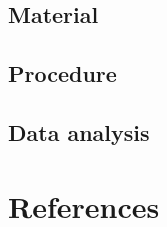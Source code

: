 \documentclass[
  man,floatsintext]{apa6}
\begin{document}
\hypertarget{material}{%
\subsection{Material}\label{material}}

\hypertarget{procedure}{%
\subsection{Procedure}\label{procedure}}

\hypertarget{data-analysis}{%
\subsection{Data analysis}\label{data-analysis}}

\newpage

\hypertarget{references}{%
\section{References}\label{references}}

\begingroup
\setlength{\parindent}{-0.5in}
\setlength{\leftskip}{0.5in}
\end{document}
